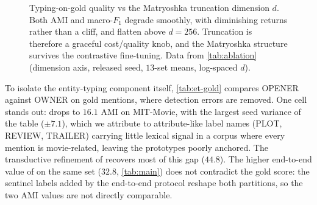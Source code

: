 \begin{figure}[t]
\centering
{}
\caption{Typing-on-gold quality vs the Matryoshka truncation dimension $d$. Both AMI and macro-$F_1$ degrade smoothly, with diminishing returns rather than a cliff, and flatten above $d{=}256$. Truncation is therefore a graceful cost/quality knob, and the Matryoshka structure survives the contrastive fine-tuning. Data from \autoref{tab:ablation} (dimension axis, released seed, $13$-set means, log-spaced $d$).}
\label{fig:matryoshka}
\end{figure}

To isolate the entity-typing component itself, \autoref{tab:et-gold} compares OPENER against OWNER on gold mentions, where detection errors are removed.
One cell stands out: \zsind drops to $16.1$ AMI on MIT-Movie, with the largest seed variance of the table ($\pm 7.1$), which we attribute to attribute-like label names (PLOT, REVIEW, TRAILER) carrying little lexical signal in a corpus where every mention is movie-related, leaving the prototypes poorly anchored. The transductive refinement of \zstr recovers most of this gap ($44.8$).
The higher end-to-end value of \zsind on the same set ($32.8$, \autoref{tab:main}) does not contradict the gold score: the sentinel labels added by the end-to-end protocol reshape both partitions, so the two AMI values are not directly comparable.

